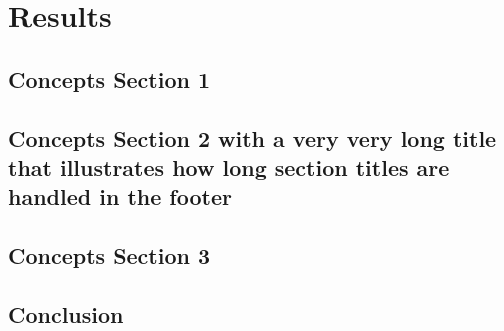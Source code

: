 %
\chapter{Results}
\label{sec:results}



\section{Concepts Section 1}
\label{sec:concepts:sec1}



\section{Concepts Section 2 with a very very long title that illustrates how long section titles are handled in the footer}
\label{sec:concepts:sec2}



\section{Concepts Section 3}
\label{sec:concepts:sec3}



\section{Conclusion}
\label{sec:concepts:conclusion}


